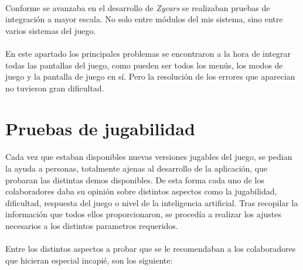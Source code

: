 \paragraph{}
Conforme se avanzaba en el desarrollo de \emph{Zycars} se realizaban pruebas de integración a mayor escala. No solo entre módulos
del mis sistema, sino entre varios sistemas del juego.

\paragraph{}
En este apartado los principales problemas se encontraron a la hora de integrar todas las pantallas del juego, como pueden ser todos
los menús, los modos de juego y la pantalla de juego en sí. Pero la resolución de los errores que aparecian no tuvieron gran 
dificultad.

\section{Pruebas de jugabilidad}

\paragraph{}
Cada vez que estaban disponibles nuevas versiones jugables del juego, se pedian la ayuda a personas, totalmente ajenas al desarrollo
de la aplicación, que probaran las distintas demos disponibles. De esta forma cada uno de los colaboradores daba su opinión sobre
distintos aspectos como la jugabilidad, dificultad, respuesta del juego o nivel de la inteligencia artificial. Tras recopilar la
información que todos ellos proporcionaron, se procedía a realizar los ajustes necesarios a los distintos parametros requeridos.

\paragraph{}
Entre los distintos aspectos a probar que se le recomendaban a los colaboradores que hicieran especial incapié, son los siguiente:

